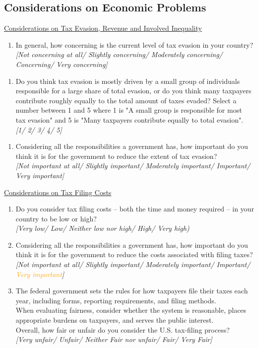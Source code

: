 \documentclass[11pt]{article}
\newcommand{\tk}[1]{\textcolor{orange}{#1}}
\begin{document}
\subsection*{Considerations on Economic Problems}
\underline{Considerations on Tax Evasion, Revenue and Involved Inequality}
\begin{enumerate}[resume]
    \item In general, how concerning is the current level of tax evasion in your country?  \\
    \textit{[Not concerning at all/ Slightly concerning/ Moderately concerning/ Concerning/ Very concerning]}
\end{enumerate}
\begin{enumerate}[resume]
    \item Do you think tax evasion is mostly driven by a small group of individuals responsible for a large share of total evasion, or do you think many taxpayers contribute roughly equally to the total amount of taxes evaded? Select a number between 1 and 5 where 1 is "A small group is responsible for most tax evasion" and 5 is "Many taxpayers contribute equally to total evasion". \\
    \textit{[1/ 2/ 3/ 4/ 5]}
    \end{enumerate}
\begin{enumerate}[resume]
    \item Considering all the responsibilities a government has, how important do you think it is for the government to reduce the extent of tax evasion? \\
    \textit{[Not important at all/ Slightly important/ Moderately important/ Important/ Very important]} 
\end{enumerate}
\underline{Considerations on Tax Filing Costs} \\ 
\begin{enumerate}[resume]
    \item Do you consider tax filing costs -- both the time and money required -- in your country to be low or high? \\ 
    \textit{[Very low/ Low/ Neither low nor high/ High/ Very high)}
    \item Considering all the responsibilities a government has, how important do you think it is for the government to reduce the costs associated with filing taxes?  \\ \textit{[Not important at all/ Slightly important/ Moderately important/ Important/ \tk{Very important}]}
    \item The federal government sets the rules for how taxpayers file their taxes each year, including forms, reporting requirements, and filing methods. \vspace{0.25em} \\
    When evaluating fairness, consider whether the system is reasonable, places appropriate burdens on taxpayers, and serves the public interest. \vspace{0.25em}\\
    Overall, how fair or unfair do you consider the U.S. tax-filing process? \\
    \textit{[Very unfair/ Unfair/ Neither Fair nor unfair/ Fair/ Very Fair]}
\end{enumerate}
\end{document}

